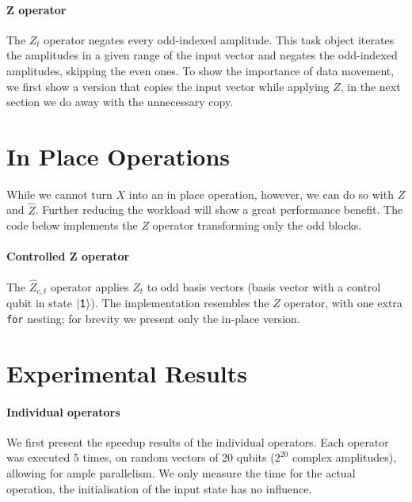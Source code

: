 \documentclass[a4paper,11pt, oneside]{report}
\newcommand{\code}[1]{\texttt{#1}}
\begin{document}
\paragraph{Z operator} The $Z_t$ operator negates every odd-indexed amplitude. This task object iterates the amplitudes in a given range of the input vector and negates the odd-indexed amplitudes, skipping the even ones. To show the importance of data movement, we first show a version that copies the input vector while applying $Z$, in the next section we do away with the unnecessary copy.


\section{In Place Operations}
While we cannot turn $X$ into an in place operation, however, we can do so with $Z$ and $\widehat{Z}$. Further reducing the workload will show a great performance benefit. The code below implements the  $Z$ operator transforming only the odd blocks.


\paragraph{Controlled Z operator} The $\widehat{Z}_{c,t}$ operator applies $Z_t$ to odd basis vectors (basis vector with a control qubit in state $\ketb{1}$). The implementation resembles the $Z$ operator, with one extra \code{for} nesting; for brevity we present only the in-place version.



\section{Experimental Results}
\paragraph{Individual operators} We first present the speedup results of the individual operators. Each operator was executed 5 times, on random vectors of 20 qubits ($2^20$ complex amplitudes), allowing for ample parallelism. We only measure the time for the actual operation, the initialisation of the input state has no influence.
\end{document}
